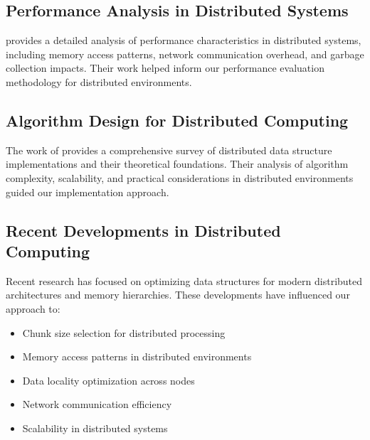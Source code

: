 \subsection{Performance Analysis in Distributed Systems}

\cite{performance-analysis} provides a detailed analysis of performance characteristics in distributed systems, including memory access patterns, network communication overhead, and garbage collection impacts. Their work helped inform our performance evaluation methodology for distributed environments.

\subsection{Algorithm Design for Distributed Computing}

The work of \cite{data-structure-survey} provides a comprehensive survey of distributed data structure implementations and their theoretical foundations. Their analysis of algorithm complexity, scalability, and practical considerations in distributed environments guided our implementation approach.

\subsection{Recent Developments in Distributed Computing}

Recent research has focused on optimizing data structures for modern distributed architectures and memory hierarchies. These developments have influenced our approach to:
\begin{itemize}
    \item Chunk size selection for distributed processing
    \item Memory access patterns in distributed environments
    \item Data locality optimization across nodes
    \item Network communication efficiency
    \item Scalability in distributed systems
\end{itemize} 